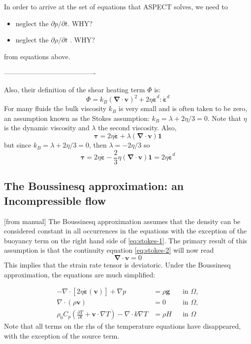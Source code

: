 In order to arrive at the set of equations that ASPECT solves, 
we need to 
\begin{itemize}
\item neglect the $\partial p/\partial t$. {\color{red}WHY?}
\item neglect the $\partial \rho / \partial t$ . {\color{red}WHY?}
\end{itemize}
from equations above. 

----------------------------------------

Also, their definition of the shear heating term $\Phi$ is:
\[
\Phi = k_B ({\bm \nabla}\cdot{\bm v})^2 + 2\eta \dot{\bm \varepsilon}^d:\dot{\bm \varepsilon}^d
\]
For many fluids the bulk viscosity $k_B$ is very small and is often taken to be zero, an assumption known
as the Stokes assumption: $k_B=\lambda+2\eta/3=0$. 
Note that $\eta$ is the dynamic viscosity and $\lambda$ the second viscosity. 
Also, 
\[
{\bm \tau}=2\eta \dot{\bm \varepsilon} + \lambda ({\bm \nabla}\cdot{\bm v}) {\bm 1}
\]
but since $k_B=\lambda+2\eta/3=0$, then $\lambda=-2\eta/3$ so 
\[
{\bm \tau}=2\eta \dot{\bm \varepsilon} -\frac{2}{3}\eta ({\bm \nabla}\cdot{\bm v}) {\bm 1} = 2\eta \dot{\bm \varepsilon}^d
\]







\newpage
\subsection{The Boussinesq approximation: an Incompressible flow}


[from \aspect{} manual]
The Boussinesq approximation assumes that the density can be
considered constant in all occurrences in the equations with the exception of
the buoyancy term on the right hand side of \eqref{eq:stokes-1}. The primary
result of this assumption is that the continuity equation \eqref{eq:stokes-2}
will now read
\[
{\bm \nabla}\cdot{\bm v} = 0
\]
This implies that the strain rate tensor is deviatoric.
Under the Boussinesq approximation, the equations are much simplified:

\begin{align}
  \label{eq:stokes-1}
  -\nabla \cdot \left[2\eta \dot{\bm \varepsilon}(\bm v)
                \right] + \nabla p &=
  \rho \bm g
  &
  & \textrm{in $\Omega$},
  \\
  \label{eq:stokes-2}
  \nabla \cdot (\rho \bm v) &= 0
  &
  & \textrm{in $\Omega$},
  \\
  \label{eq:temperature}
  \rho_0 C_p \left(\frac{\partial T}{\partial t} + \bm v\cdot\nabla T\right)
  - \nabla\cdot k\nabla T
  &=
  \rho H
  &
  & \textrm{in $\Omega$}
\end{align}
Note that all terms on the rhs of the temperature equations have disappeared, with the exception 
of the source term.


